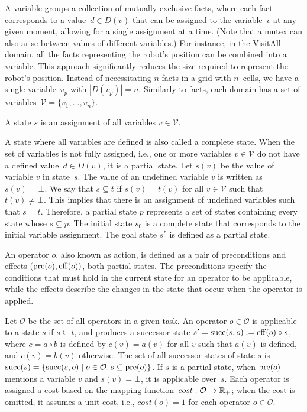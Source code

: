 A variable groups a collection of mutually exclusive facts, where each fact corresponds to a value~$d \in D(v)$ that can be assigned to the variable~$v$ at any given moment, allowing for a single assignment at a time. (Note that a mutex can also arise between values of different variables.) For instance, in the VisitAll domain, all the facts representing the robot's position can be combined into a variable. This approach significantly reduces the size required to represent the robot's position. Instead of necessitating $n$ facts in a grid with $n$~cells, we have a single variable~$v_p$ with $|D(v_p)| = n$. Similarly to facts, each domain has a set of variables~$\mathcal{V} = \{v_1,\ldots,v_n\}$.

\begin{definition}[State]\label{def:state}
    A state $s$ is an assignment of all variables $v \in \mathcal{V}$.
\end{definition}

A state where all variables are defined is also called a complete state. When the set of variables is not fully assigned, i.e., one or more variables $v \in \mathcal{V}$ do not have a defined value~$d \in D(v)$, it is a partial state. Let $s(v)$ be the value of variable $v$ in state~$s$. The value of an undefined variable $v$ is written as $s(v) = \bot$. We say that $s \subseteq t$ if $s(v) = t(v)$ for all $v \in \mathcal{V}$ such that $t(v) \neq \bot$. This implies that there is an assignment of undefined variables such that $s = t$. Therefore, a partial state $p$ represents a set of states containing every state whose $s \subseteq p$. The initial state $s_0$ is a complete state that corresponds to the initial variable assignment. The goal state $s^*$ is defined as a partial state.

\begin{definition}[Operator]\label{def:operator}
    An operator $o$, also known as action, is defined as a pair of preconditions and effects $(\operatorname{pre}(o),\operatorname{eff}(o))$, both partial states. The preconditions specify the conditions that must hold in the current state for an operator to be applicable, while the effects describe the changes in the state that occur when the operator is applied.
\end{definition}

Let $\mathcal{O}$ be the set of all operators in a given task. An operator $o \in \mathcal{O}$ is applicable to a state $s$ if $s \subseteq t$, and produces a successor state $s' = \operatorname{succ}(s,o) := \operatorname{eff}(o) \circ s$, where \mbox{$c = a \circ b$} is defined by $c(v) = a(v)$ for all $v$ such that $a(v)$ is defined, and $c(v)=b(v)$ otherwise. The set of all successor states of state $s$ is~$\operatorname{succ}(s)=\{\operatorname{succ}(s,o)\mid o\in \mathcal{O}, s \subseteq \operatorname{pre}(o)\}$. If $s$ is a partial state, when $\operatorname{pre}(o)$ mentions a variable $v$ and $s(v) = \bot$, it is applicable over~$s$. Each operator is assigned a cost based on the mapping function~$cost:\mathcal{O}\rightarrow\mathbb{R}_{+}$; when the cost is omitted, it assumes a unit cost, i.e., $cost(o) = 1$ for each operator $o \in \mathcal{O}$.

